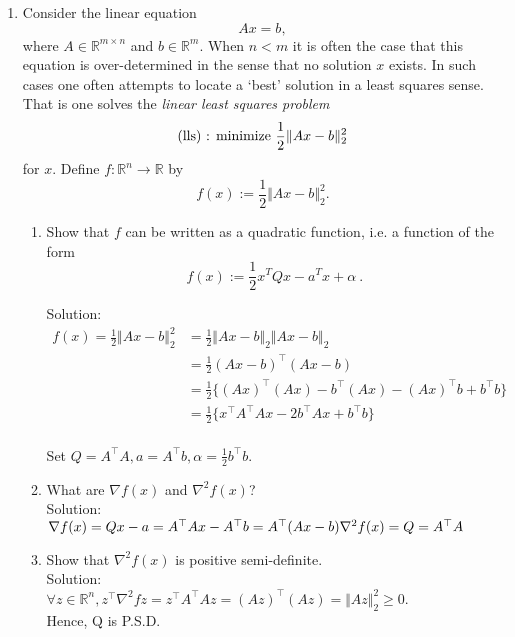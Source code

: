 \documentclass[12pt]{amsart}
\newcommand{\norm}[1]{\Vert #1 \Vert}
\newcommand{\Rn}{\R^n}
\newcommand{\Rm}{\R^m}
\newcommand{\R}{{\mathbb{R}}}
\newcommand{\grad}{\nabla}
\newcommand{\map}[3]{#1:#2\rightarrow #3}
\newcommand{\half}{\frac{1}{2}}
\newcommand{\Rmn}{\R^{m\times n}}
\newcommand{\tpose}[1]{#1^{\scriptscriptstyle T}}
\begin{document}
\begin{enumerate}
\item
 Consider the linear equation $$Ax=b,$$ where $A \in \Rmn$
and $b \in \Rm$. When $n<m$ it is often the case that this
equation is over-determined in the sense that no solution $x$
exists. In such cases one often attempts to locate a `best'
solution in a least squares sense. That is one solves the
{\it linear least squares problem}
$$\hbox{(lls) : minimize } \half \norm{Ax-b}^2_2$$
for $x$. Define $\map{f}{\Rn}{\R}$ by
$$f(x):= \half \norm{Ax-b}^2_2.$$
\begin{enumerate}
\item Show that $f$ can be written as a quadratic function, i.e.
a function of the form
$$f(x):=\frac{1}{2} \tpose{x} Q x -\tpose{a}x +\alpha \  .$$

\noindent
Solution:\\
\begin{align*}
f(x) = \frac{1}{2} \norm{Ax-b}^2_2 &= \frac{1}{2}\norm{Ax-b}_2 \norm{Ax-b}_2 \\
&= \frac{1}{2} (Ax-b)^\top (Ax-b) \\
&= \frac{1}{2} \{(Ax)^\top (Ax) - b^\top (Ax) - (Ax)^\top b + b^\top b \} \\
&= \frac{1}{2} \{x^\top A^\top A x - 2 b^\top Ax + b^\top b \} 
\end{align*} \\

Set $Q = A^\top A, a = A^\top b, \alpha = \frac{1}{2} b^\top b$. \\

\item What are $\grad f(x)$ and $\grad^2 f(x)$? \\

\noindent
Solution: \\
$\grad f(x) = Qx - a = A^\top Ax - A^\top b = A^\top (Ax-b) \\
\grad^2 f(x) = Q = A^\top A$ \\

\item Show that $\grad^2 f(x)$ is positive semi-definite. \\

\noindent
Solution: \\
$ \forall z \in \mathbb{R}^n, z^\top \grad^2 f z = z^\top A^\top A z = (Az)^\top (Az) = \norm{Az}^2_2 \geq 0$.  \\
Hence, Q is P.S.D.  \\


\end{enumerate}
\end{enumerate}
\end{document}
